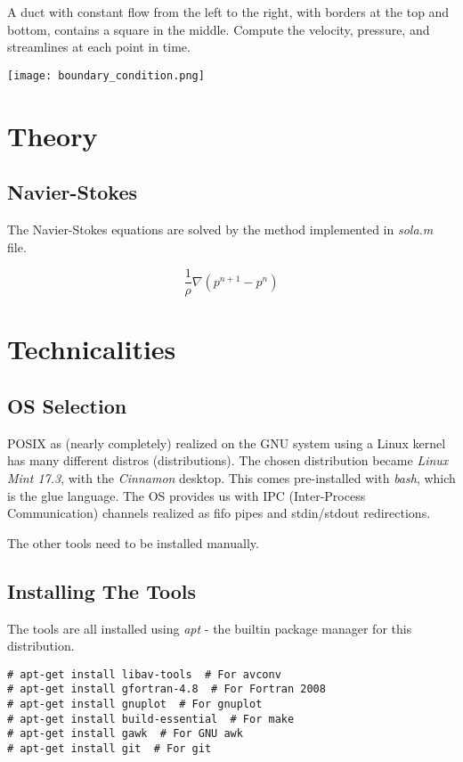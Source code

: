 \documentclass[listof=totoc]{report}
\begin{document}
A duct with constant flow from the left to the right, with borders at the top and bottom, contains a square in the middle. Compute the velocity, pressure, and streamlines at each point in time. \\

\begin{center}
\texttt{[image: boundary\_condition.png]}
\end{center}

\chapter{Theory}
\section{Navier-Stokes}
The Navier-Stokes equations are solved by the method implemented in \emph{sola.m} file.

$$ \frac{1}{\rho} \nabla (p^{n+1} - p^n) $$

\chapter{Technicalities}
\section{OS Selection}
POSIX as (nearly completely) realized on the GNU system using a Linux kernel has many different distros (distributions). The chosen distribution became \emph{Linux Mint 17.3}, with the \emph{Cinnamon} desktop. This comes pre-installed with \emph{bash}, which is the glue language. The OS provides us with IPC (Inter-Process Communication) channels realized as fifo pipes and stdin/stdout redirections.

The other tools need to be installed manually.

\section{Installing The Tools}
The tools are all installed using \emph{apt} - the builtin package manager for this distribution.

\begin{verbatim}
# apt-get install libav-tools  # For avconv
# apt-get install gfortran-4.8  # For Fortran 2008
# apt-get install gnuplot  # For gnuplot
# apt-get install build-essential  # For make
# apt-get install gawk  # For GNU awk
# apt-get install git  # For git
\end{verbatim}
\end{document}
